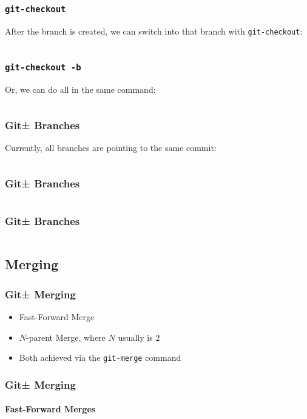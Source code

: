 \documentclass[]{beamer}
\begin{document}
\begin{frame}[fragile]
\frametitle{\texttt{git-checkout}}
After the branch is created, we can switch into that branch with
\texttt{git-checkout}:
\inputminted{bash}{code/5/3}
\end{frame}

\begin{frame}[fragile]
\frametitle{\texttt{git-checkout -b}}
Or, we can do all in the same command:
\inputminted{bash}{code/5/4}
\end{frame}

\begin{frame}[fragile]
\frametitle{Git± Branches}
Currently, all branches are pointing to the same commit:
\inputminted{bash}{code/5/5}
\end{frame}

\begin{frame}[fragile]
\frametitle{Git± Branches}
\inputminted{bash}{code/5/6}
\end{frame}

\begin{frame}[fragile]
\frametitle{Git± Branches}
\inputminted{bash}{code/5/7}
\end{frame}

\subsection{Merging}
\begin{frame}
\frametitle{Git± Merging}
\begin{itemize}
\item{Fast-Forward Merge}
\item{$N$-parent Merge, where $N$ usually is $2$}
\item{Both achieved via the \texttt{git-merge} command}
\end{itemize}
\end{frame}

\begin{frame}
\frametitle{Git± Merging}
\framesubtitle{Fast-Forward Merges}
\begin{figure}
\end{figure}
\end{frame}
\end{document}

